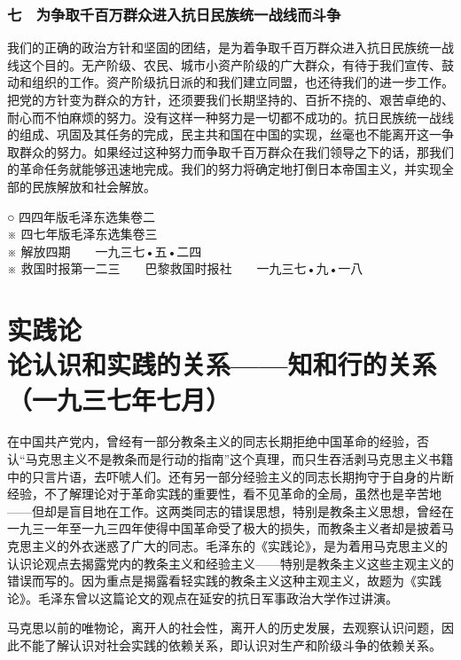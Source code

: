 \documentclass[cn,11pt,chinese]{elegantbook}
\def\myformat#1{\hfil\hfil #1}
\begin{document}
\subsubsection*{\myformat{七　为争取千百万群众进入抗日民族统一战线而斗争 }}
我们的正确的政治方针和坚固的团结，是为着争取千百万群众进入抗日民族统一战线这个目的。无产阶级、农民、城市小资产阶级的广大群众，有待于我们宣传、鼓动和组织的工作。资产阶级抗日派的和我们建立同盟，也还待我们的进一步工作。把党的方针变为群众的方针，还须要我们长期坚持的、百折不挠的、艰苦卓绝的、耐心而不怕麻烦的努力。没有这样一种努力是一切都不成功的。抗日民族统一战线的组成、巩固及其任务的完成，民主共和国在中国的实现，丝毫也不能离开这一争取群众的努力。如果经过这种努力而争取千百万群众在我们领导之下的话，那我们的革命任务就能够迅速地完成。我们的努力将确定地打倒日本帝国主义，并实现全部的民族解放和社会解放。\\
\begin{flushright}
○ 四四年版毛泽东选集卷二\\
※ 四七年版毛泽东选集卷三\\
※ 解放四期　　一九三七•五•二四\\
※ 救国时报第一二三　　巴黎救国时报社　　一九三七•九•一八
\end{flushright}
\newpage\section*{\myformat{实践论}\\\myformat{论认识和实践的关系——知和行的关系}\\\myformat{（一九三七年七月）}}
\begin{introduction}\item  在中国共产党内，曾经有一部分教条主义的同志长期拒绝中国革命的经验，否认“马克思主义不是教条而是行动的指南”这个真理，而只生吞活剥马克思主义书籍中的只言片语，去吓唬人们。还有另一部分经验主义的同志长期拘守于自身的片断经验，不了解理论对于革命实践的重要性，看不见革命的全局，虽然也是辛苦地——但却是盲目地在工作。这两类同志的错误思想，特别是教条主义思想，曾经在一九三一年至一九三四年使得中国革命受了极大的损失，而教条主义者却是披着马克思主义的外衣迷惑了广大的同志。毛泽东的《实践论》，是为着用马克思主义的认识论观点去揭露党内的教条主义和经验主义——特别是教条主义这些主观主义的错误而写的。因为重点是揭露看轻实践的教条主义这种主观主义，故题为《实践论》。毛泽东曾以这篇论文的观点在延安的抗日军事政治大学作过讲演。\end{introduction}
马克思以前的唯物论，离开人的社会性，离开人的历史发展，去观察认识问题，因此不能了解认识对社会实践的依赖关系，即认识对生产和阶级斗争的依赖关系。\\
\end{document}

